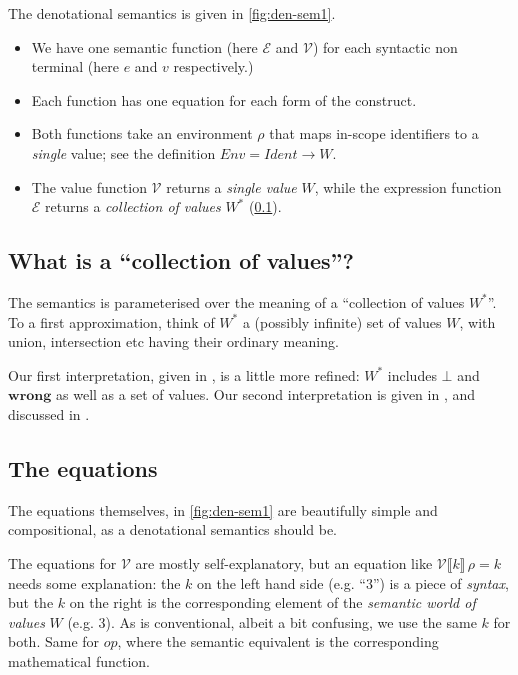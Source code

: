 \documentclass[acmsmall,review,dvipsnames]{acmart}
\newcommand{\Varid}[1]{\mathit{#1}}
\newcommand{\Value}{W}
\newcommand{\Env}{Env}
\newcommand{\semfun}[1]{\mathcal{#1}}
\newcommand{\semapp}[3]{\semfun{#1}\llbracket #2 \rrbracket\, #3}
\newcommand{\mtype}{\Value^{*}}
\newcommand{\wrong}{\mathbf{wrong}}
\begin{document}
The denotational semantics is given in \cref{fig:den-sem1}.
\begin{itemize}
\item We have one semantic function (here $\semfun{E}$ and $\semfun{V}$) for each syntactic
  non terminal (here $e$ and $v$ respectively.)
\item Each function has one equation for each form of the construct.
\item Both functions take an environment $\rho$ that maps in-scope identifiers to
  a \emph{single} value; see the definition $\Env = Ident \rightarrow \Value$.
\item The value function $\semfun{V}$ returns a \emph{single value} $\Value$, while
  the expression function $\semfun{E}$ returns a \emph{collection of values} $\mtype$ (\cref{sec:collection}).
\end{itemize}

\subsection{What is a ``collection of values''?} \label{sec:collection}

The semantics is parameterised over the meaning of a ``collection of values $\mtype$''.
To a first approximation, think of $\mtype$ a (possibly infinite) set of values $\Value$,
with union, intersection etc having their ordinary meaning.

Our first interpretation,
given in , is a little more refined: $\mtype$ includes $\bot$ and $\wrong$ as
well as a set of values.  Our second interpretation is given in , and
discussed in .

\subsection{The equations}

The equations themselves, in \cref{fig:den-sem1}
are beautifully simple and compositional, as a denotational semantics should be.

The equations for $\semfun{V}$ are mostly self-explanatory, but an equation like $\semapp{V}{\ensuremath{\Varid{k}}}{\rho} = k$ needs some
explanation: the $k$ on the left hand side (e.g. ``\ensuremath{\mathrm{3}}'') is a piece of \emph{syntax}, but the $k$ on the right is the corresponding
element of the \emph{semantic world of values} $\Value$ (e.g. $3$). As is conventional, albeit a bit confusing,
we use the same $k$ for both.  Same for $op$, where the semantic equivalent is the corresponding mathematical function.
\end{document}
